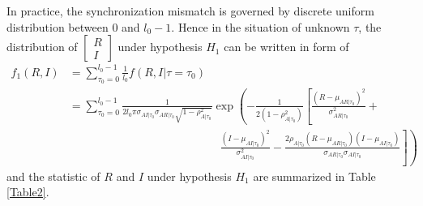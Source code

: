 In practice, the synchronization mismatch is governed by discrete uniform distribution between $0$ and $l_0-1$. Hence in the situation of unknown $\tau$, the distribution of  
$\begin{bmatrix}
  R \\
  I
\end{bmatrix}$
under hypothesis $H_1$ can be written in form of 
\begin{equation}
  \begin{split}
	f_1(R, I) &= \sum_{\tau_0 = 0}^{l_0-1} \frac{1}{l_0}f(R, I|\tau=\tau_0)\\
	&= \sum_{\tau_0 = 0}^{l_0-1}\frac{1}{2l_0\pi\sigma_{AI|\tau_0}\sigma_{AR|\tau_0}\sqrt{1 - \rho_{A|\tau_0}^2}}\exp\left( -\frac{1}{2(1-\rho_{A|\tau_0}^2)}\left[ \frac{(R-\mu_{AR|\tau_0})^2}{\sigma_{AR|\tau_0}^2} + \right.\right.\\
	& \left. \left. \;\;\;\;\;\;\;\;\;\;\;\;\;\;\;\; \;\;\;\;\;\;\;\;\;\;\;\;\;\;\;\; \;\;\;\;\;\;\;\;\;\;\;\;\;\;\;\; \frac{(I-\mu_{AI|\tau_0})^2}{\sigma_{AI|\tau_0}^2} - \frac{2\rho_{A|\tau_0}(R-\mu_{AR|\tau_0})(I-\mu_{AI|\tau_0})}{\sigma_{AR|\tau_0}\sigma_{AI|\tau_0}}\right] \right)
  \end{split}
  \label{f_1underH1}
\end{equation}
and the statistic of $R$ and $I$  under hypothesis $H_1$ are summarized in Table \ref{Table2}.
